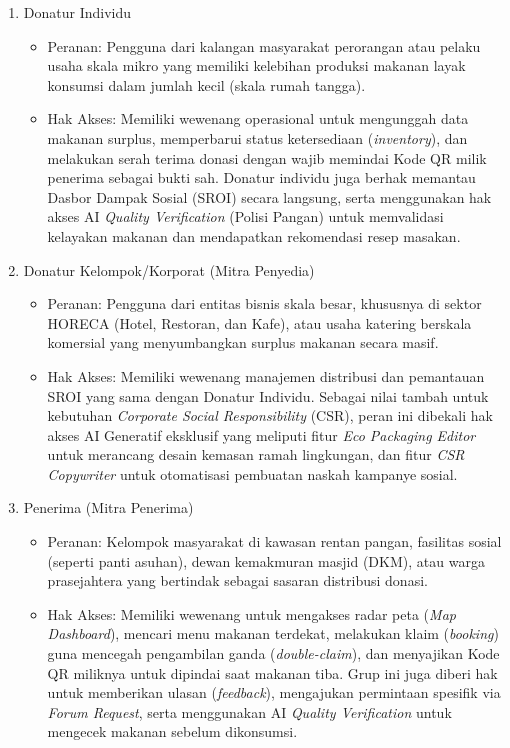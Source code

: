 \begin{enumerate}
    \item Donatur Individu
    \begin{itemize}
        \item Peranan: Pengguna dari kalangan masyarakat perorangan atau pelaku usaha skala mikro yang memiliki kelebihan produksi makanan layak konsumsi dalam jumlah kecil (skala rumah tangga).
        \item Hak Akses: Memiliki wewenang operasional untuk mengunggah data makanan surplus, memperbarui status ketersediaan (\textit{inventory}), dan melakukan serah terima donasi dengan wajib memindai Kode QR milik penerima sebagai bukti sah. Donatur individu juga berhak memantau Dasbor Dampak Sosial (SROI) secara langsung, serta menggunakan hak akses AI \textit{Quality Verification} (Polisi Pangan) untuk memvalidasi kelayakan makanan dan mendapatkan rekomendasi resep masakan.
    \end{itemize}

    \item Donatur Kelompok/Korporat (Mitra Penyedia)
    \begin{itemize}
        \item Peranan: Pengguna dari entitas bisnis skala besar, khususnya di sektor HORECA (Hotel, Restoran, dan Kafe), atau usaha katering berskala komersial yang menyumbangkan surplus makanan secara masif.
        \item Hak Akses: Memiliki wewenang manajemen distribusi dan pemantauan SROI yang sama dengan Donatur Individu. Sebagai nilai tambah untuk kebutuhan \textit{Corporate Social Responsibility} (CSR), peran ini dibekali hak akses AI Generatif eksklusif yang meliputi fitur \textit{Eco Packaging Editor} untuk merancang desain kemasan ramah lingkungan, dan fitur \textit{CSR Copywriter} untuk otomatisasi pembuatan naskah kampanye sosial.
    \end{itemize}

    \item Penerima (Mitra Penerima)
    \begin{itemize}
        \item Peranan: Kelompok masyarakat di kawasan rentan pangan, fasilitas sosial (seperti panti asuhan), dewan kemakmuran masjid (DKM), atau warga prasejahtera yang bertindak sebagai sasaran distribusi donasi.
        \item Hak Akses: Memiliki wewenang untuk mengakses radar peta (\textit{Map Dashboard}), mencari menu makanan terdekat, melakukan klaim (\textit{booking}) guna mencegah pengambilan ganda (\textit{double-claim}), dan menyajikan Kode QR miliknya untuk dipindai saat makanan tiba. Grup ini juga diberi hak untuk memberikan ulasan (\textit{feedback}), mengajukan permintaan spesifik via \textit{Forum Request}, serta menggunakan AI \textit{Quality Verification} untuk mengecek makanan sebelum dikonsumsi.
    \end{itemize}


\end{enumerate}
